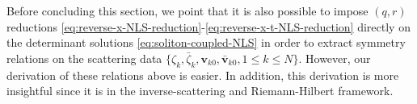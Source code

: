 Before concluding this section, we point that it is also possible to impose $ (q,r) $ reductions \eqref{eq:reverse-x-NLS-reduction}-\eqref{eq:reverse-x-t-NLS-reduction} directly on the determinant solutions \eqref{eq:soliton-coupled-NLS} in order to extract symmetry relations on the scattering data $ \{\zeta_{k},\bar{\zeta}_{k},\mathbf{v}_{k0}, \bar{\mathbf{v}}_{k0}, 1 \leq k \leq N \} $. However, our derivation of these relations above is easier. In addition, this derivation is more insightful since it is in the inverse-scattering and Riemann-Hilbert framework.